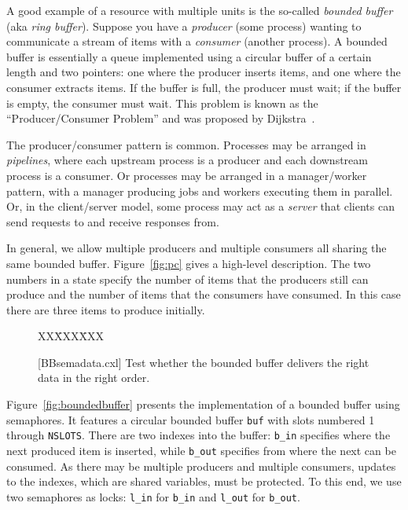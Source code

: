 \documentclass{report}
\newcommand{\cxlsource}[1]{
\begin{tabbing}
XX\=XXX\=XXX\kill
    
\end{tabbing}
}
\newenvironment{code}{
\tcolorbox
}{
\endtcolorbox
}
\begin{document}
A good example of a resource with multiple units is the
so-called \emph{bounded buffer} (aka \emph{ring buffer}).
Suppose you have a \emph{producer} (some process) wanting to
communicate a stream of items with a \emph{consumer} (another process).
A bounded buffer is essentially
a queue implemented using a circular buffer
of a certain length and two pointers:
one where the producer inserts items, and one where the consumer extracts
items.  If the
buffer is full, the producer must wait; if the buffer is empty, the
consumer must wait.
This problem is known as the ``Producer/Consumer Problem'' and was
proposed by Dijkstra~\cite{EWD329}.

The producer/consumer pattern is common.  Processes may be arranged
in \emph{pipelines},
where each upstream process is a producer and each downstream
process is a consumer.
Or processes may be arranged in a manager/worker pattern, with a manager
producing jobs and workers executing them in parallel.
Or, in the client/server model,
some process may act as a \emph{server} that clients can send requests to
and receive responses from.

In general, we allow multiple producers and multiple consumers
all sharing the same bounded buffer.
Figure~\ref{fig:pc} gives a high-level description.  The
two numbers in a state specify
the number of items that the producers still can produce and
the number of items that the consumers have consumed.  In this case
there are three items to produce initially.

\begin{figure}
\begin{code}
\cxlsource{BBsemadata}
\end{code}
\caption{[BBsemadata.cxl] Test whether the bounded buffer delivers the right data in the
right order.}
\label{fig:PCsemadata}
\end{figure}

Figure~\ref{fig:boundedbuffer} presents the implementation of a bounded
buffer using semaphores.  It features a circular bounded buffer \texttt{buf} with
slots numbered 1 through \texttt{NSLOTS}.  There are two indexes into
the buffer: \texttt{b\_in} specifies where the next produced item is inserted,
while \texttt{b\_out} specifies from where the next can be consumed.
As there may be multiple producers and multiple
consumers, updates to the indexes, which are shared variables, must be protected.
To this end, we use two semaphores as locks: \texttt{l\_in} for \texttt{b\_in}
and \texttt{l\_out} for \texttt{b\_out}.
\end{document}
